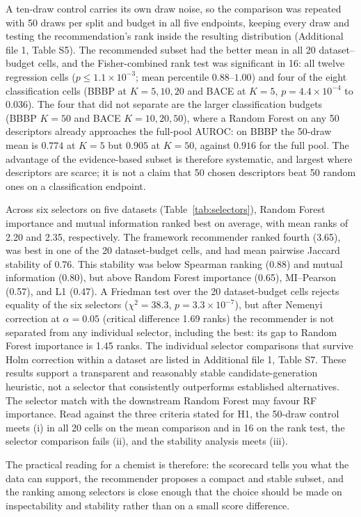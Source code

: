 A ten-draw control carries its own draw noise, so the comparison was repeated with 50 draws per split and budget in all five endpoints, keeping every draw and testing the recommendation's rank inside the resulting distribution (Additional file 1, Table S5). The recommended subset had the better mean in all 20 dataset--budget cells, and the Fisher-combined rank test was significant in 16: all twelve regression cells ($p\leq1.1\times10^{-3}$; mean percentile $0.88$--$1.00$) and four of the eight classification cells (BBBP at $K=5,10,20$ and BACE at $K=5$, $p=4.4\times10^{-4}$ to $0.036$). The four that did not separate are the larger classification budgets (BBBP $K=50$ and BACE $K=10,20,50$), where a Random Forest on any 50 descriptors already approaches the full-pool AUROC: on BBBP the 50-draw mean is $0.774$ at $K=5$ but $0.905$ at $K=50$, against $0.916$ for the full pool. The advantage of the evidence-based subset is therefore systematic, and largest where descriptors are scarce; it is not a claim that 50 chosen descriptors beat 50 random ones on a classification endpoint.

Across six selectors on five datasets (Table~\ref{tab:selectors}), Random Forest importance and mutual information ranked best on average, with mean ranks of 2.20 and 2.35, respectively. The framework recommender ranked fourth (3.65), was best in one of the 20 dataset-budget cells, and had mean pairwise Jaccard stability of 0.76. This stability was below Spearman ranking (0.88) and mutual information (0.80), but above Random Forest importance (0.65), MI--Pearson (0.57), and L1 (0.47). A Friedman test over the 20 dataset-budget cells rejects equality of the six selectors ($\chi^2=38.3$, $p=3.3\times10^{-7}$), but after Nemenyi correction at $\alpha=0.05$ (critical difference 1.69 ranks) the recommender is not separated from any individual selector, including the best: its gap to Random Forest importance is 1.45 ranks. The individual selector comparisons that survive Holm correction within a dataset are listed in Additional file 1, Table S7. These results support a transparent and reasonably stable candidate-generation heuristic, not a selector that consistently outperforms established alternatives. The selector match with the downstream Random Forest may favour RF importance. Read against the three criteria stated for H1, the 50-draw control meets (i) in all 20 cells on the mean comparison and in 16 on the rank test, the selector comparison fails (ii), and the stability analysis meets (iii).

The practical reading for a chemist is therefore: the scorecard tells you what the data can support, the recommender proposes a compact and stable subset, and the ranking among selectors is close enough that the choice should be made on inspectability and stability rather than on a small score difference.

